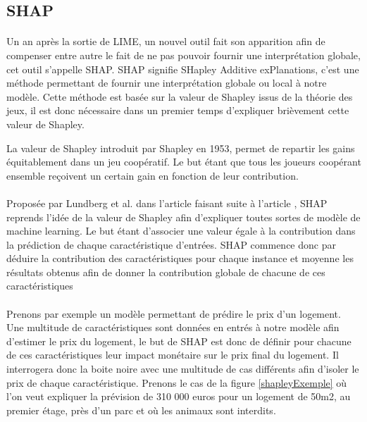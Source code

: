 \subsection{SHAP}
\paragraph{}Un an après la sortie de LIME, un nouvel outil fait son apparition afin de compenser entre autre le fait de ne pas pouvoir fournir une interprétation globale, cet outil s'appelle SHAP. SHAP signifie SHapley Additive exPlanations, c'est une méthode permettant de fournir une interprétation globale ou local à notre modèle. Cette méthode est basée sur la valeur de Shapley issus de la théorie des jeux, il est donc nécessaire dans un premier temps d'expliquer brièvement cette valeur de Shapley.\par
La valeur de Shapley introduit par Shapley en 1953, permet de repartir les gains équitablement dans un jeu coopératif. Le but étant que tous les joueurs coopérant ensemble reçoivent un certain gain en fonction de leur contribution.

\paragraph{}Proposée par Lundberg et al. dans l'article \cite{shapLast} faisant suite à l'article \cite{shapFirst}, SHAP reprends l'idée de la valeur de Shapley afin d'expliquer toutes sortes de modèle de machine learning. Le but étant d'associer une valeur égale à la contribution dans la prédiction de chaque caractéristique d'entrées. SHAP commence donc par déduire la contribution des caractéristiques pour chaque instance et moyenne les résultats obtenus afin de donner la contribution globale de chacune de ces caractéristiques

\paragraph{}Prenons par exemple un modèle permettant de prédire le prix d'un logement. Une multitude de caractéristiques sont données en entrés à notre modèle afin d'estimer le prix du logement, le but de SHAP est donc de définir pour chacune de ces caractéristiques leur impact monétaire sur le prix final du logement. Il interrogera donc la boite noire avec une multitude de cas différents afin d'isoler le prix de chaque caractéristique. Prenons le cas de la figure \ref{shapleyExemple} où l'on veut expliquer la prévision de 310 000 euros pour un logement de 50m2, au premier étage, près d'un parc et où les animaux sont interdits.

